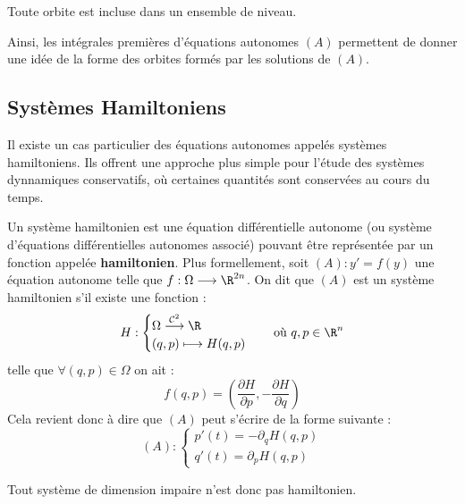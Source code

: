 \begin{prop}
    Toute orbite est incluse dans un ensemble de niveau. 
\end{prop}

Ainsi, les intégrales premières d'équations autonomes $(A)$ permettent de donner une idée de la forme des orbites formés
par les solutions de $(A)$. 

\subsection{Systèmes Hamiltoniens}

Il existe un cas particulier des équations autonomes appelés systèmes hamiltoniens. Ils offrent une approche plus 
simple pour l'étude des systèmes dynnamiques conservatifs, où certaines quantités sont conservées au cours du temps. 

\begin{definition}
    Un système hamiltonien est une équation différentielle autonome (ou système d'équations différentielles autonomes associé) 
    pouvant être représentée par un fonction appelée \textbf{hamiltonien}. 
    Plus formellement, soit $(A) : y' = f(y)$ une équation autonome telle que $f : \Omega \longrightarrow \R^{2n}$. 
    On dit que $(A)$ est un système hamiltonien s'il existe une fonction : 
    \[ H : 
        \begin{cases}
            \Omega \overset{ \mathcal{C}^2}{\longrightarrow} \R \\ 
            (q,p) \longmapsto H(q,p) 
        \end{cases} 
        \quad \text{où } q,p \in \R^n \] 
    telle que $ \forall (q,p) \in \Omega$ on ait : 
        \[ \boxed{f(q,p) = \left( \frac{\partial H}{\partial p}, - \frac{\partial H}{\partial q} \right)  } \] 
    Cela revient donc à dire que $(A)$ peut s'écrire de la forme suivante : 
        \[ (A) : 
            \begin{cases}
                p'(t) = - \partial_q H(q,p) \\ 
                q'(t) = \partial_p H(q,p) 
            \end{cases} \] 
\end{definition}

\begin{remark}
    Tout système de dimension impaire n'est donc pas hamiltonien. 
\end{remark}

